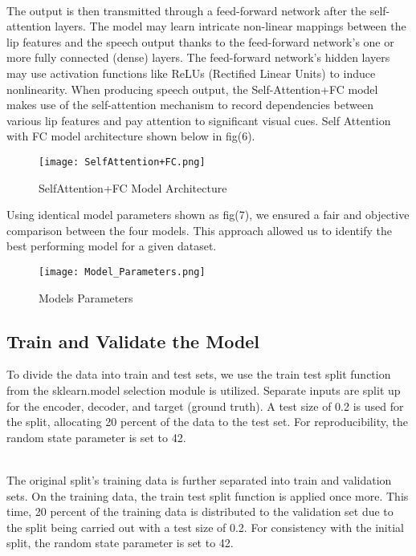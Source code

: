 \documentclass[conference]{IEEEtran}
\begin{document}
\\ The output is then transmitted through a feed-forward network after the self-attention layers. The model may learn intricate non-linear mappings between the lip features and the speech output thanks to the feed-forward network's one or more fully connected (dense) layers. The feed-forward network's hidden layers may use activation functions like ReLUs (Rectified Linear Units) to induce nonlinearity. When producing speech output, the Self-Attention+FC model makes use of the self-attention mechanism to record dependencies between various lip features and pay attention to significant visual cues. Self Attention with FC model architecture shown below in fig(6).

\begin{figure}[htbp]
\centerline{\texttt{[image: SelfAttention+FC.png]}}
\caption{SelfAttention+FC Model Architecture}
\label{fig}
\end{figure}

Using identical model parameters shown as fig(7), we ensured a fair and objective comparison between the four models. This approach allowed us to identify the best performing model for a given dataset. 

\begin{figure}[htbp]
\centerline{\texttt{[image: Model\_Parameters.png]}}
\caption{Models Parameters}
\label{fig}
\end{figure}

\subsection{Train and Validate the Model}
To divide the data into train and test sets, we use the train test split function from the sklearn.model selection module is utilized.
Separate inputs are split up for the encoder, decoder, and target (ground truth). A test size of 0.2 is used for the split, allocating 20 percent of the data to the test set. For reproducibility, the random state parameter is set to 42.

\\ The original split's training data is further separated into train and validation sets. On the training data, the train test split function is applied once more. This time, 20 percent of the training data is distributed to the validation set due to the split being carried out with a test size of 0.2. For consistency with the initial split, the random state parameter is set to 42.
\end{document}

